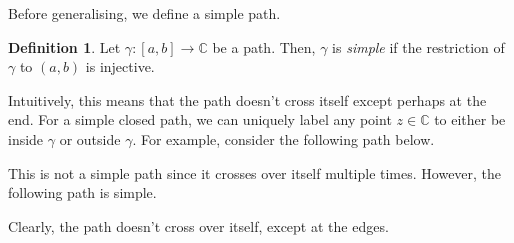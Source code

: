 \documentclass[a4paper, openany]{memoir}
\theoremstyle{definition}
\newtheorem{definition}{Definition}[section]
\theoremstyle{plain}
\begin{document}
Before generalising, we define a simple path.
\begin{definition}
Let $\gamma: [a, b] \to \mathbb{C}$ be a path. Then, $\gamma$ is \emph{simple} if the restriction of $\gamma$ to $(a, b)$ is injective.
\end{definition}
\noindent Intuitively, this means that the path doesn't cross itself except perhaps at the end. For a simple closed path, we can uniquely label any point $z \in \mathbb{C}$ to either be inside $\gamma$ or outside $\gamma$. For example, consider the following path below.
\begin{figure}[H]
    \centering
\end{figure}
\noindent This is not a simple path since it crosses over itself multiple times. However, the following path is simple.
\begin{figure}[H]
    \centering
\end{figure}
\noindent Clearly, the path doesn't cross over itself, except at the edges.
\end{document}
